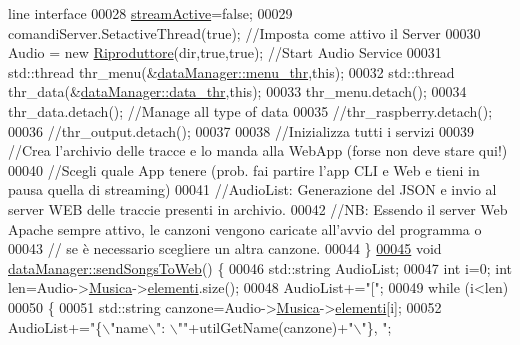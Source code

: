 \begin{DoxyCode}
{       line interface}
00028     \hyperlink{classdataManager_a73070a3be96596028b91542367e1ebdd}{streamActive}=\textcolor{keyword}{false};
00029     comandiServer.SetactiveThread(\textcolor{keyword}{true}); \textcolor{comment}{//Imposta come attivo il Server}
00030     Audio = \textcolor{keyword}{new} \hyperlink{classRiproduttore}{Riproduttore}(dir,\textcolor{keyword}{true},\textcolor{keyword}{true}); \textcolor{comment}{//Start Audio Service}
00031     std::thread thr\_menu(&\hyperlink{classdataManager_a7ba580547b0d0dbe516b8e694e9f51b2}{dataManager::menu_thr},\textcolor{keyword}{this});
00032     std::thread thr\_data(&\hyperlink{classdataManager_a509a1915ab57d91969f4d7075a138c2e}{dataManager::data_thr},\textcolor{keyword}{this});
00033     thr\_menu.detach();
00034     thr\_data.detach(); \textcolor{comment}{//Manage all type of data}
00035     \textcolor{comment}{//thr\_raspberry.detach();}
00036     \textcolor{comment}{//thr\_output.detach();}
00037 
00038     \textcolor{comment}{//Inizializza tutti i servizi}
00039     \textcolor{comment}{//Crea l'archivio delle tracce e lo manda alla WebApp (forse non deve stare
       qui!)}
00040     \textcolor{comment}{//Scegli quale App tenere (prob. fai partire l'app CLI e Web e tieni in
       pausa quella di streaming)}
00041     \textcolor{comment}{//AudioList: Generazione del JSON e invio al server WEB delle traccie
       presenti in archivio.}
00042     \textcolor{comment}{//NB: Essendo il server Web Apache sempre attivo, le canzoni vengono
       caricate all'avvio del programma o}
00043     \textcolor{comment}{//    se è necessario scegliere un altra canzone.}
00044 \}
\hypertarget{dataManagerHub_8cpp_source_l00045}{}\hyperlink{classdataManager_a69df5746c83be0abbb051ba4bd4d96d6}{00045} \textcolor{keywordtype}{void} \hyperlink{classdataManager_a69df5746c83be0abbb051ba4bd4d96d6}{dataManager::sendSongsToWeb}() \{
00046     std::string AudioList;
00047     \textcolor{keywordtype}{int} i=0; \textcolor{keywordtype}{int} len=Audio->\hyperlink{classRiproduttore_a373b2d6675abc22dbe61abf2223cacab}{Musica}->\hyperlink{classusbData_ab0a9963ce896605e7e988e01e6efe1ba}{elementi}.size();
00048     AudioList+=\textcolor{stringliteral}{"["};
00049     \textcolor{keywordflow}{while} (i<len)
00050     \{
00051         std::string canzone=Audio->\hyperlink{classRiproduttore_a373b2d6675abc22dbe61abf2223cacab}{Musica}->\hyperlink{classusbData_ab0a9963ce896605e7e988e01e6efe1ba}{elementi}[i];
00052         AudioList+=\textcolor{stringliteral}{"\{\(\backslash\)"name\(\backslash\)": \(\backslash\)""}+utilGetName(canzone)+\textcolor{stringliteral}{"\(\backslash\)"\}, "};

\end{DoxyCode}
